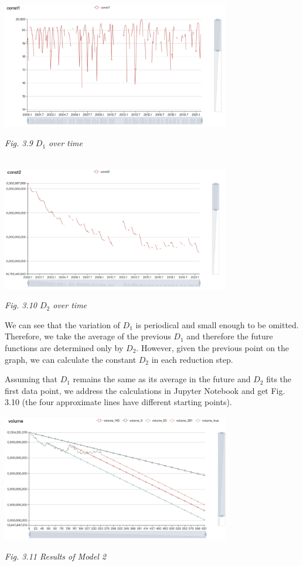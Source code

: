 \documentclass[12pt]{article}
\theoremstyle{definition}
\theoremstyle{remark}
\numberwithin{equation}{section}
\begin{document}
		\begin{center}
		\includegraphics[width=10cm]{3.9 D_1 over time.jpg}

		\small \textit{Fig. 3.9 $D_1$ over time}

		~\\

		\includegraphics[width=10cm]{3.10 D_2 over time.jpg}

		\small \textit{Fig. 3.10 $D_2$ over time}
		\end{center}

		We can see that the variation of $D_1$ is periodical and small enough to be omitted. Therefore, we take the average of the previous $D_1$ and therefore the future functions are determined only by $D_2$. However, given the previous point on the graph, we can calculate the constant $D_2$ in each reduction step. 

		Assuming that $D_1$ remains the same as its average in the future and $D_2$ fits the first data point, we address the calculations in Jupyter Notebook and get Fig. 3.10 (the four approximate lines have different starting points).

		\begin{center}
		\includegraphics[width=10cm]{3.11 Results of Model 2.jpg}

		\small \textit{Fig. 3.11 Results of Model 2}
		\end{center}
\end{document}
